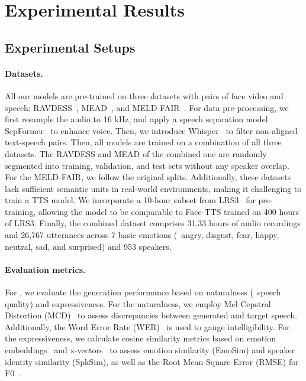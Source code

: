 
\section{Experimental Results}
\label{sec:result}


\subsection{Experimental Setups}
\paragraph{Datasets.~~\xspace}
All our models are pre-trained on three datasets with pairs of face video and speech: RAVDESS~\cite{RAVDESS}, MEAD~\cite{MEAD:conf/eccv/WangWSYWQHQL20, EAT:conf/iccv/GanYYSY23}, and MELD-FAIR~\cite{meldfair:journals/ijon/CarneiroWW23}. 
For data pre-processing, we first resample the audio to 16 kHz, and apply a speech separation model SepFormer~\cite{sepformer/SubakanRCBZ21} to enhance voice. Then, we introduce Whisper~\cite{whisper/RadfordKXBMS23} to filter non-aligned text-speech pairs.
Then, all models are trained on a combination of all three datasets. 
The RAVDESS and MEAD of the combined one are randomly segmented into training, validation, and test sets without any speaker overlap. For the MELD-FAIR, we follow the original splits. 
Additionally, these datasets lack sufficient semantic units in real-world environments, making it challenging to train a TTS model. We incorporate a 10-hour subset from LRS3~\cite{LRS3/abs-1809-00496} for pre-training, allowing the model to be comparable to Face-TTS trained on 400 hours of LRS3. 
Finally, the combined dataset comprises 31.33 hours of audio recordings and 26,767 utterances across 7 basic emotions (\ie~angry, disgust, fear, happy, neutral, sad, and surprised) and 953 speakers.


\paragraph{Evaluation metrics.~~\xspace}
For \taskname, we evaluate the generation performance based on naturalness (\ie~speech quality) and expressiveness. For the naturalness, we employ Mel Cepstral Distortion (MCD)~\cite{visualvoicecloning/ChenTQZLW22} to assess discrepancies between generated and target speech. Additionally, the Word Error Rate (WER)~\cite{WER/WangSZRBSXJRS18,whisper/RadfordKXBMS23} is used to gauge intelligibility. 
For the expressiveness, we calculate cosine similarity metrics based on emotion embeddings~\cite{emo2vec:conf/acl/MaZYLGZ024} and x-vectors~\cite{xvector_tts/DuGCY23} to assess emotion similarity (EmoSim) and speaker identity similarity (SpkSim), as well as the Root Mean Square Error (RMSE) for F0~\cite{RMSEf0:conf/asru/HayashiTKTT17}.

